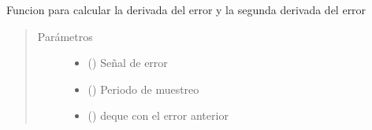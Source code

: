 \documentclass[letterpaper,10pt,spanish]{sphinxmanual}
\begin{document}

\begin{fulllineitems}
\label{\detokenize{codigos/discreto_generator:discreto_generator.derivadas_discretas}}
Funcion para calcular la derivada del error y la segunda derivada del error
\begin{quote}\begin{description}
\item[{Parámetros}] \leavevmode\begin{itemize}
\item {} 
 () \textendash{} Señal de error

\item {} 
 () \textendash{} Periodo de muestreo

\item {} 
 () \textendash{} deque con el error anterior

\end{itemize}

\end{description}\end{quote}

\end{fulllineitems}

\end{document}
